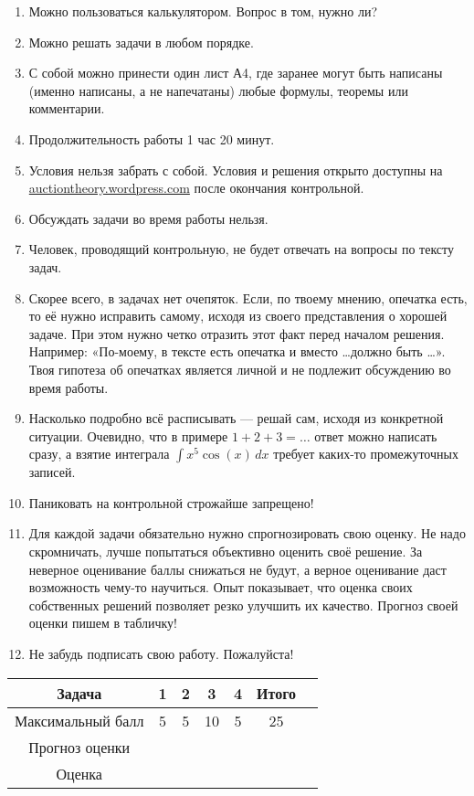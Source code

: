 \documentclass[11pt, openany]{book}
\numberwithin{equation}{page} %
\theoremstyle{definition} %
\theoremstyle{definition}
\theoremstyle{definition}
\begin{document}
\begin{enumerate}
\item Можно пользоваться калькулятором. Вопрос в том, нужно ли?
\item Можно решать задачи в любом порядке.
\item С собой можно принести один лист А4, где заранее могут быть написаны (именно написаны, а не напечатаны) любые формулы, теоремы или комментарии.
\item Продолжительность работы 1 час 20 минут.
\item Условия нельзя забрать с собой. Условия и решения открыто доступны на \url{auctiontheory.wordpress.com} после окончания контрольной.
\item Обсуждать задачи во время работы нельзя.
\item Человек, проводящий контрольную, не будет отвечать на вопросы по тексту задач.
\item Скорее всего, в задачах нет очепяток. Если, по твоему мнению, опечатка есть, то её нужно исправить самому, исходя из своего представления о хорошей задаче. При этом нужно четко отразить этот факт перед началом решения. Например: «По-моему, в тексте есть опечатка и вместо \ldots должно быть \ldots». Твоя гипотеза об опечатках является личной и не подлежит обсуждению во время работы.
\item Насколько подробно всё расписывать — решай сам, исходя из конкретной ситуации. Очевидно, что в примере $ 1+2+3=\ldots $ ответ можно написать сразу, а взятие интеграла $ \int x^{5}\cos(x)\, dx $ требует каких-то промежуточных записей.
\item Паниковать на контрольной строжайше запрещено!
\item Для каждой задачи обязательно нужно спрогнозировать свою оценку. Не надо скромничать, лучше попытаться объективно оценить своё решение.  За неверное оценивание баллы снижаться не будут, а верное оценивание даст возможность чему-то научиться. Опыт показывает, что оценка своих собственных решений позволяет резко улучшить их качество. Прогноз своей оценки пишем в табличку!
\item Не забудь подписать свою работу. Пожалуйста!

\end{enumerate}

\begin{tabular}{ccccccc}
\toprule
Задача & 1 & 2 & 3 & 4 & Итого \\
\midrule
Максимальный балл & 5 & 5 & 10 & 5 & 25 \\
Прогноз оценки &  &  &  &  &   \\
Оценка &  &  &  &  &   \\
\bottomrule
\end{tabular}
\newpage
\end{document}
